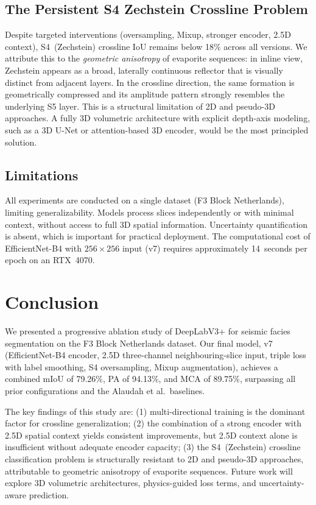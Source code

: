 \documentclass[journal]{IEEEtran}
\begin{document}
\subsection{The Persistent S4 Zechstein Crossline Problem}

Despite targeted interventions (oversampling, Mixup, stronger encoder, 2.5D context), S4~(Zechstein) crossline IoU remains below 18\% across all versions. We attribute this to the \emph{geometric anisotropy} of evaporite sequences: in inline view, Zechstein appears as a broad, laterally continuous reflector that is visually distinct from adjacent layers. In the crossline direction, the same formation is geometrically compressed and its amplitude pattern strongly resembles the underlying S5 layer. This is a structural limitation of 2D and pseudo-3D approaches. A fully 3D volumetric architecture with explicit depth-axis modeling, such as a 3D U-Net or attention-based 3D encoder, would be the most principled solution.

\subsection{Limitations}

All experiments are conducted on a single dataset (F3 Block Netherlands), limiting generalizability. Models process slices independently or with minimal context, without access to full 3D spatial information. Uncertainty quantification is absent, which is important for practical deployment. The computational cost of EfficientNet-B4 with $256\times256$ input (v7) requires approximately 14~seconds per epoch on an RTX~4070.

\section{Conclusion}
\label{sec:conclusion}

We presented a progressive ablation study of DeepLabV3+ for seismic facies segmentation on the F3 Block Netherlands dataset. Our final model, v7 (EfficientNet-B4 encoder, 2.5D three-channel neighbouring-slice input, triple loss with label smoothing, S4 oversampling, Mixup augmentation), achieves a combined mIoU of 79.26\%, PA of 94.13\%, and MCA of 89.75\%, surpassing all prior configurations and the Alaudah et al.\ baselines.

The key findings of this study are: (1) multi-directional training is the dominant factor for crossline generalization; (2) the combination of a strong encoder with 2.5D spatial context yields consistent improvements, but 2.5D context alone is insufficient without adequate encoder capacity; (3) the S4~(Zechstein) crossline classification problem is structurally resistant to 2D and pseudo-3D approaches, attributable to geometric anisotropy of evaporite sequences. Future work will explore 3D volumetric architectures, physics-guided loss terms, and uncertainty-aware prediction.
\end{document}
